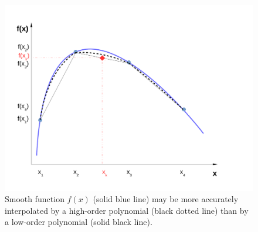      \begin{figure}[h]\label{Appendix:Fig:Interpolation}%
        \begin{center}
          \includegraphics[width=\columnwidth,clip]{./Pics/Interpolation}
           \caption{Smooth function $f(x)$ (solid blue line) may be more accurately interpolated by a high-order polynomial (black dotted line) than by a low-order polynomial (solid black line).} 
        \end{center}
      \end{figure}

